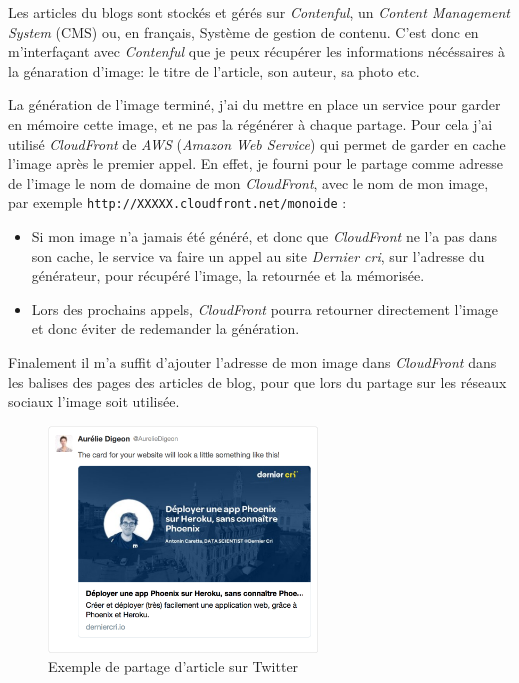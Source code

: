 \bigskip

Les articles du blogs sont stockés et gérés sur \emph{Contenful}, un
\emph{Content Management System} (CMS) ou, en français, Système de
gestion de contenu. C'est donc en m'interfaçant avec \emph{Contenful}
que je peux récupérer les informations nécéssaires à la génaration
d'image: le titre de l'article, son auteur, sa photo etc.

\bigskip

La génération de l'image terminé, j'ai du mettre en place un service
pour garder en mémoire cette image, et ne pas la régénérer à chaque
partage. Pour cela j'ai utilisé \emph{CloudFront} de \emph{AWS}
(\emph{Amazon Web Service}) qui permet de garder en cache l'image après
le premier appel. En effet, je fourni pour le partage comme adresse de
l'image le nom de domaine de mon \emph{CloudFront}, avec le nom de mon
image, par exemple \texttt{http://XXXXX.cloudfront.net/monoide} :

\begin{itemize}
\item
  Si mon image n'a jamais été généré, et donc que \emph{CloudFront} ne
  l'a pas dans son cache, le service va faire un appel au site
  \emph{Dernier cri}, sur l'adresse du générateur, pour récupéré
  l'image, la retournée et la mémorisée.
\item
  Lors des prochains appels, \emph{CloudFront} pourra retourner
  directement l'image et donc éviter de redemander la génération.
\end{itemize}

\bigskip

Finalement il m'a suffit d'ajouter l'adresse de mon image dans
\emph{CloudFront} dans les balises des pages des articles de blog, pour
que lors du partage sur les réseaux sociaux l'image soit utilisée.

\begin{figure}[h]
  \centering
  \includegraphics[height=6cm]{figures/partage-blog.png}
  \caption{Exemple de partage d'article sur Twitter}
\end{figure}

